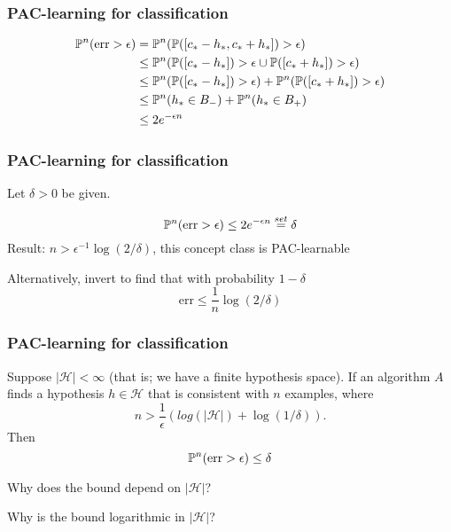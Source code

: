 \documentclass[12pt]{beamer}
\begin{document}
\begin{frame}[fragile]
\frametitle{PAC-learning for classification}

\vsp
{}


\begin{align*}
\P^n (\textrm{err} > \epsilon) 
& =
\P^n(\P([c_*-h_*,c_*+h_*] )> \epsilon) \\
& \leq
\P^n(\P([c_*-h_*])>\epsilon \cup \P([c_*+h_*])> \epsilon) \\
& \leq
\P^n(\P([c_*-h_*])>\epsilon) +  \P^n(\P([c_*+h_*])> \epsilon) \\
& \leq
\P^n(h_* \in B_-) +  \P^n(h_* \in B_+) \\
& \leq 
2e^{-\epsilon n}
\end{align*}
\end{frame}
\begin{frame}[fragile]
\frametitle{PAC-learning for classification}
\vsp

\vsp

Let $\delta > 0$ be given.

\[
\P^n (\textrm{err} > \epsilon)  \leq 2e^{-\epsilon n} \stackrel{set}{=} \delta
\]
Result: $n > \epsilon^{-1} \log(2/\delta)$, this concept class 
is PAC-learnable

\vsp
Alternatively, invert to find that with probability $1-\delta$
\[
\textrm{err} \leq \frac{1}{n} \log(2/\delta)
\]

\end{frame}


\begin{frame}[fragile]
\frametitle{PAC-learning for classification}

\vsp
Suppose $|\mathcal{H}| < \infty$ (that is; we have a finite hypothesis space).  If an algorithm $A$ finds
a hypothesis $h \in \mathcal{H}$ that is  consistent with $n$ examples, where 
\[
n > \frac{1}{\epsilon}(log(|\mathcal{H}|) + \log(1/\delta)).
\]
Then
\[
\P^n(\textrm{err} > \epsilon) \leq \delta
\]

\vsp
Why does the bound depend on $|\mathcal{H}|$?

\pause
{}
\pause
\vsp

Why is the bound logarithmic in $|\mathcal{H}|$?
\pause


\end{frame}
\end{document}
